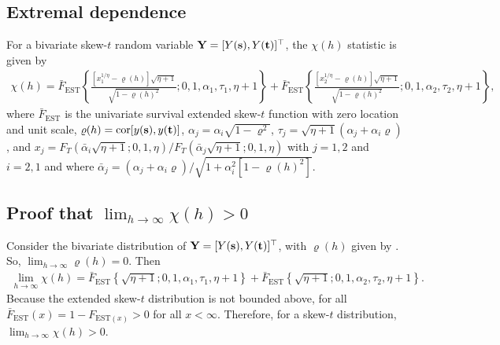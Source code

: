 \documentclass[useAMS,usenatbib,referee]{biomweb}
\begin{document}
\subsection*{Extremal dependence}
For a bivariate skew-$t$ random variable $\mbox{\bf Y} = [Y(\mbox{\bf s}), Y(\mbox{\bf t})]^\top$, the $\chi(h)$ statistic \citep{Padoan2011} is given by
\begin{align} \label{steq:chiskew-t}
  \chi(h) = \bar{F}_{\text{EST}}\left\{ \frac{[x_1^{1 / \eta} - \varrho(h)] \sqrt{\eta + 1} }{\sqrt{1 - \varrho(h)^2}}; 0, 1, \alpha_1, \tau_1, \eta + 1 \right\} + \bar{F}_{\text{EST}}\left\{ \frac{ [x_2^{1 / \eta} - \varrho(h)] \sqrt{\eta + 1} }{ \sqrt{1 - \varrho(h)^2} }; 0, 1, \alpha_2, \tau_2, \eta + 1 \right\},
\end{align}
where $\bar{F}_{\text{EST}}$ is the univariate survival extended skew-$t$ function with zero location and unit scale, \hbox{$\varrho(h) = \text{cor}[y(\mbox{\bf s}), y(\mbox{\bf t})]$}, $\alpha_j = \alpha_i \sqrt{1 - \varrho^2}$, $\tau_j = \sqrt{\eta + 1}(\alpha_j + \alpha_i \varrho)$, and $x_j = F_T(\bar{\alpha}_i \sqrt{\eta + 1}; 0, 1, \eta) / F_T(\bar{\alpha}_j \sqrt{\eta + 1}; 0, 1, \eta)$ with $j = 1, 2$ and $i = 2, 1$ and where $\bar{\alpha}_j = (\alpha_j + \alpha_i \varrho) / \sqrt{ 1 + \alpha_i^2 [1 - \varrho(h)^2]}$.

\subsection*{Proof that $\lim_{h \rightarrow \infty} \chi(h) > 0$}
Consider the bivariate distribution of $\mbox{\bf Y} = [Y(\mbox{\bf s}), Y(\mbox{\bf t})]^\top$, with $\varrho(h)$ given by .
So, $\lim_{h \rightarrow \infty} \varrho(h) = 0$.
Then
\begin{align}
  \lim_{h \rightarrow \infty} \chi(h) = \bar{F}_{\text{EST}}\left\{ \sqrt{\eta + 1}; 0, 1, \alpha_1, \tau_1, \eta + 1 \right\} + \bar{F}_{\text{EST}}\left\{ \sqrt{\eta + 1}; 0, 1, \alpha_2, \tau_2, \eta + 1 \right\}.
\end{align}
Because the extended skew-$t$ distribution is not bounded above, for all $\bar{F}_{\text{EST}}(x) = 1 - F_{\text{EST} (x)} > 0$ for all $x < \infty$.
Therefore, for a skew-$t$ distribution, $\lim_{h \rightarrow \infty} \chi(h) > 0$.
\end{document}
